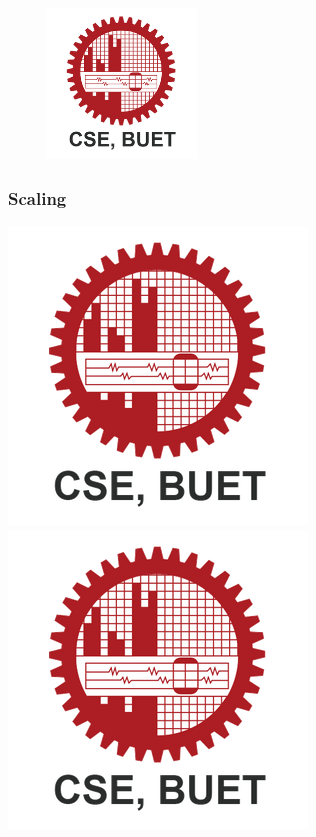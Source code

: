 \documentclass{article}
\begin{document}
\includegraphics[width=6cm, height=4cm]{Images/CSE_BUET.png}


\pagebreak


\subsubsection{Scaling}
\includegraphics[scale=.2]{Images/CSE_BUET.png}
\includegraphics[scale=1.2]{Images/CSE_BUET.png}

\pagebreak
\end{document}

